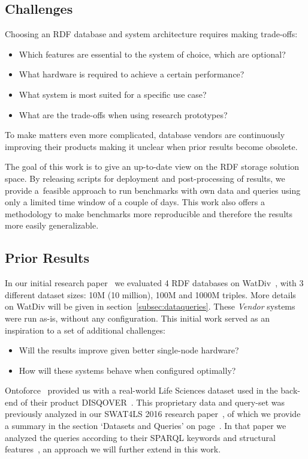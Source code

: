 \subsection{Challenges}
Choosing an RDF database and system architecture requires making trade-offs: 

\begin{itemize}
	\item Which features are essential to the system of choice, which are optional?
	\item What hardware is required to achieve a certain performance?
	\item What system is most suited for a specific use case?
	\item What are the trade-offs when using research prototypes? 
\end{itemize}

To make matters even more complicated, database vendors are continuously improving their products making it unclear when prior results become obsolete.

The goal of this work is to give an up-to-date view on the RDF storage solution space.
By releasing scripts for deployment and post-processing of results, we provide a~feasible approach to run benchmarks with own data and queries using only a limited time window of a couple of days.
This work also offers a methodology to make benchmarks more reproducible and therefore the results more easily generalizable.

\subsection{Prior Results}
In our initial research paper~\cite{de2016big} we evaluated 4 RDF databases on WatDiv~\cite{alucc2014diversified}, with 3 different dataset sizes: 10M (10 million), 100M and 1000M triples. More details on WatDiv will be given in section~\ref{subsec:dataqueries}. These \emph{Vendor} systems were run as-is, without any configuration. 
This initial work served as an inspiration to a set of additional challenges:

\begin{itemize}
\item Will the results improve given better single-node hardware?
\item How will these systems behave when configured optimally?
\end{itemize}

Ontoforce~\cite{ontoforcewebsite} provided us with a real-world Life \mbox{Sciences} dataset used in the back-end of their product \mbox{DISQOVER~\cite{disqover}}. This proprietary data and query-set was previously analyzed in our SWAT4LS 2016 research paper~\cite{dewitte_swat4ls_2016}, of which we provide a summary in the section `Datasets and Queries' on page~\pageref{subsec:dataqueries}.
In that paper we analyzed the queries according to their SPARQL keywords and structural features~\cite{DBLP:journals/corr/abs-1103-5043}, an approach we will further extend in this work. 

